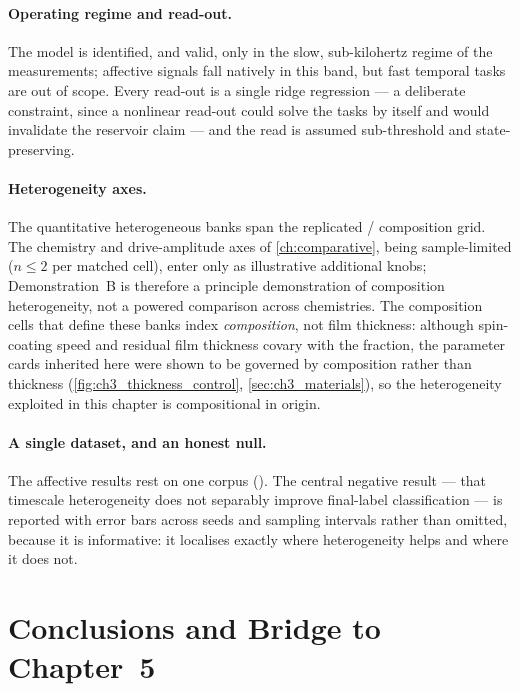 \documentclass[12pt, twoside]{report}
\begin{document}
\paragraph{Operating regime and read-out.} The model is identified, and valid, only in the slow, sub-kilohertz regime of the measurements; affective signals fall natively in this band, but fast temporal tasks are out of scope. Every read-out is a single ridge regression --- a deliberate constraint, since a nonlinear read-out could solve the tasks by itself and would invalidate the reservoir claim --- and the read is assumed sub-threshold and state-preserving.

\paragraph{Heterogeneity axes.} The quantitative heterogeneous banks span the replicated \PEO{}/\LiTf{} composition grid. The chemistry and drive-amplitude axes of \cref{ch:comparative}, being sample-limited ($n\le 2$ per matched cell), enter only as illustrative additional knobs; Demonstration~B is therefore a principle demonstration of composition heterogeneity, not a powered comparison across chemistries. The composition cells that define these banks index \emph{composition}, not film thickness: although spin-coating speed and residual film thickness covary with the \PEO{} fraction, the parameter cards inherited here were shown to be governed by composition rather than thickness (\cref{fig:ch3_thickness_control}, \cref{sec:ch3_materials}), so the heterogeneity exploited in this chapter is compositional in origin.

\paragraph{A single dataset, and an honest null.} The affective results rest on one corpus (\WESAD{}). The central negative result --- that timescale heterogeneity does not separably improve final-label classification --- is reported with error bars across seeds and sampling intervals rather than omitted, because it is informative: it localises exactly where heterogeneity helps and where it does not.

\section{Conclusions and Bridge to Chapter~5}\label{sec:ch4_conclusions}
\end{document}
